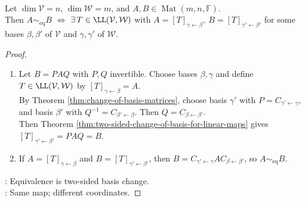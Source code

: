 \begin{theorem} \label{thm:matrix-equivalence-same-linear-map} \\
Let $\dim\mathcal{V}=n$, $\dim\mathcal{W}=m$, and $A,B\in\operatorname{Mat}(m,n,\mathbb{F})$.\\
Then $A\sim_{\mathrm{eq}}B$ $\Longleftrightarrow$ $\exists\,T\in\LL(\mathcal{V},\mathcal{W})$ with $A=[T]_{\gamma\leftarrow\beta},\ B=[T]_{\gamma'\leftarrow\beta'}$ for some bases $\beta,\beta'$ of $\mathcal{V}$ and $\gamma,\gamma'$ of $\mathcal{W}$.
\begin{proof}
\begin{enumerate}[label=\roman*.]
\setlength{\itemsep}{0pt}
\item[$(\Rightarrow)$] Let $B=PAQ$ with $P,Q$ invertible. Choose bases $\beta,\gamma$ and define $T\in\LL(\mathcal{V},\mathcal{W})$ by $[T]_{\gamma\leftarrow\beta}=A$.\\
By Theorem \ref{thm:change-of-basis-matrices}, choose basis $\gamma'$ with $P=C_{\gamma'\leftarrow\gamma}$, and basis $\beta'$ with $Q^{-1}=C_{\beta'\leftarrow\beta}$. Then $Q=C_{\beta\leftarrow\beta'}$.\\
Then Theorem \ref{thm:two-sided-change-of-basis-for-linear-maps} gives $[T]_{\gamma'\leftarrow\beta'}=PAQ=B$.
\item[$(\Leftarrow)$] If $A=[T]_{\gamma\leftarrow\beta}$ and $B=[T]_{\gamma'\leftarrow\beta'}$, then $B=C_{\gamma'\leftarrow\gamma}AC_{\beta\leftarrow\beta'}$, so $A\sim_{\mathrm{eq}}B$.
\end{enumerate}
: Equivalence is two-sided basis change.\\
: Same map; different coordinates.
\end{proof}
\end{theorem}

